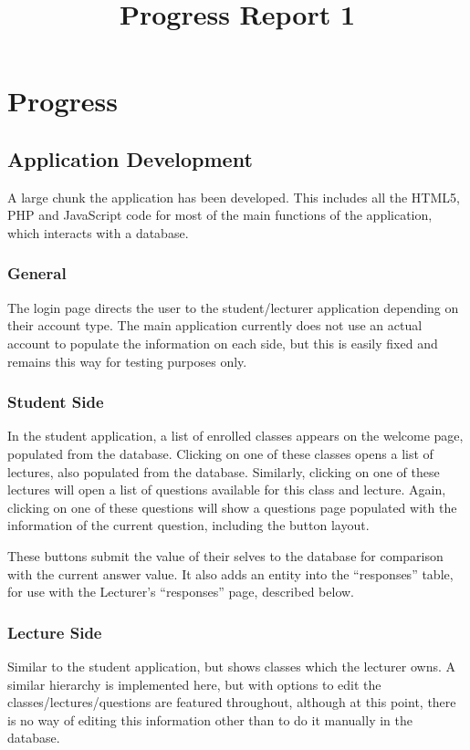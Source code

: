 \documentclass{article}
\title{
\textmd{\textbf{Progress Report 1}}\\
}
\author{\textbf{\hmwkAuthorName}}
\begin{document}
\newpage
\section{Progress}
\subsection{Application Development}
A large chunk the application has been developed. This includes all the HTML5, PHP and JavaScript code for most of the main functions of the application, which interacts with a database.

\subsubsection{General}
The login page directs the user to the student/lecturer application depending on their account type. The main application currently does not use an actual account to populate the information on each side, but this is easily fixed and remains this way for testing purposes only.

\subsubsection{Student Side}
In the student application, a list of enrolled classes appears on the welcome page, populated from the database. Clicking on one of these classes opens a list of lectures, also populated from the database. Similarly, clicking on one of these lectures will open a list of questions available for this class and lecture. Again, clicking on one of these questions will show a questions page populated with the information of the current question, including the button layout.

These buttons submit the value of their selves to the database for comparison with the current answer value. It also adds an entity into the ``responses'' table, for use with the Lecturer's ``responses'' page, described below.

\subsubsection{Lecture Side}
Similar to the student application, but shows classes which the lecturer owns. A similar hierarchy is implemented here, but with options to edit the classes/lectures/questions are featured throughout, although at this point, there is no way of editing this information other than to do it manually in the database.
\end{document}
